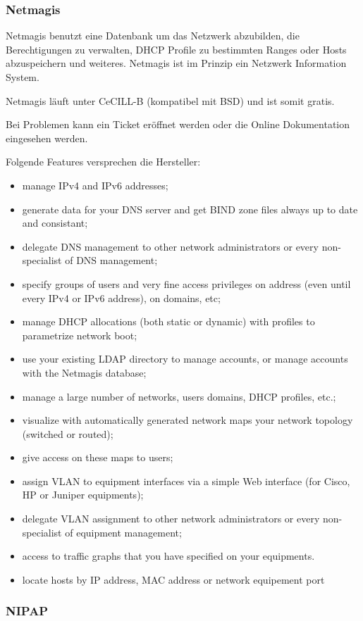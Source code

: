 \documentclass[11pt,a4paper,parskip=half]{scrartcl}
\begin{document}
\subsubsection{Netmagis}
Netmagis benutzt eine Datenbank um das Netzwerk abzubilden, die Berechtigungen zu verwalten, DHCP Profile zu bestimmten Ranges oder Hosts abzuspeichern und weiteres. Netmagis ist im Prinzip ein Netzwerk Information System.

Netmagis läuft unter CeCILL-B (kompatibel mit BSD) und ist somit gratis.

Bei Problemen kann ein Ticket eröffnet werden oder die Online Dokumentation eingesehen werden.

Folgende Features versprechen die Hersteller:
\begin{itemize}
\item{manage IPv4 and IPv6 addresses;}
\item{generate data for your DNS server and get BIND zone files always up to date and consistant;}
\item{delegate DNS management to other network administrators or every non-specialist of DNS management;}
\item{specify groups of users and very fine access privileges on address (even until every IPv4 or IPv6 address), on domains, etc;}
\item{manage DHCP allocations (both static or dynamic) with profiles to parametrize network boot;}
\item{use your existing LDAP directory to manage accounts, or manage accounts with the Netmagis database;}
\item{manage a large number of networks, users domains, DHCP profiles, etc.;}
\item{visualize with automatically generated network maps your network topology (switched or routed);}
\item{give access on these maps to users;}
\item{assign VLAN to equipment interfaces via a simple Web interface (for Cisco, HP or Juniper equipments);}
\item{delegate VLAN assignment to other network administrators or every non-specialist of equipment management;}
\item{access to traffic graphs that you have specified on your equipments.}
\item{locate hosts by IP address, MAC address or network equipement port}
\end{itemize}

\subsubsection{NIPAP}
\end{document}
